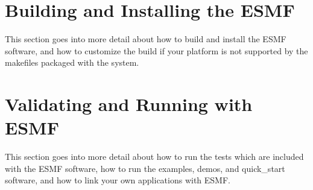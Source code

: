 
\setlength{\parskip}{1.5ex}
\setlength{\parindent}{0em}

\section{Building and Installing the ESMF}
\label{sec:TechOver}

This section goes into more detail about how to build and install the ESMF
software, and how to customize the build if your platform is not supported by
the makefiles packaged with the system.




\section{Validating and Running with ESMF}
\label{sec:TechOver2}

This section goes into more detail about how to run the tests which are
included with the ESMF software, how to run the examples, demos, and
quick\_start software, and how to link your own applications with ESMF.





